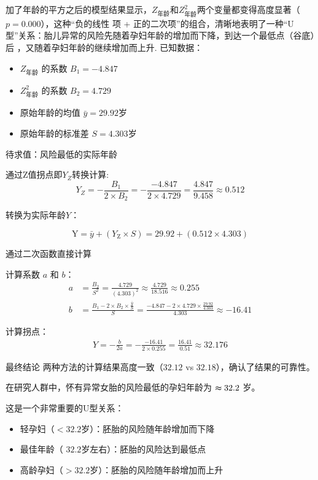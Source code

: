 \documentclass[withoutpreface,notoc]{cumcmthesis}
\begin{document}
	加了年龄的平方之后的模型结果显示，$Z_{\text{年龄}}$和$Z^{2}_{\text{年龄}}$两个变量都变得高度显著（$p=0.000$），这种“负的线性
	项 + 正的二次项”的组合，清晰地表明了一种“U型”关系：胎儿异常的风险先随着孕妇年龄的增加而下降，到达一个最低点（谷底）后
	，又随着孕妇年龄的继续增加而上升.
	已知数据：
	\begin{itemize}
		\item 	$Z_{\text{年龄}} $ 的系数  $B_{1} = -4.847$
		\item 	$Z^{2}_{\text{年龄}}$ 的系数 $B_{2} = 4.729$
		\item 	原始年龄的均值 $\bar{y} = 29.92 $岁
		\item 	原始年龄的标准差 $S = 4.303 $岁
	\end{itemize}

	待求值：风险最低的实际年龄

	通过Z值拐点即$Y_{Z}$转换计算:
	\begin{equation}
	Y_{Z} = -\frac{B_1}{2 \times B_2} = -\frac{-4.847}{2 \times 4.729} = \frac{4.847}{9.458} \approx 0.512
	\end{equation}

	转换为实际年龄$Y$：

	\begin{equation}
	\text{Y} = \bar{y} + (Y_{\text{Z}} \times S) = 29.92 + (0.512 \times 4.303)
	\end{equation}

	通过二次函数直接计算

	计算系数 $a$ 和 $b$：
	\begin{align}
	a &= \frac{B_2}{S^2} = \frac{4.729}{(4.303)^2} \approx \frac{4.729}{18.516} \approx 0.255 \\
	b &= \frac{B_1 - 2 \times B_2 \times \frac{\bar{y}}{S}}{S} = \frac{-4.847 - 2 \times 4.729 \times \frac{29.92}{4.303}}{4.303} \approx -16.41
	\end{align}

	计算拐点：
	\begin{align}
	Y = -\frac{b}{2a} = -\frac{-16.41}{2 \times 0.255} = \frac{16.41}{0.51} \approx 32.176
	\end{align}

	最终结论
	两种方法的计算结果高度一致（$32.12$ vs $32.18$），确认了结果的可靠性。

	在研究人群中，怀有异常女胎的风险最低的孕妇年龄为  $\thickapprox 32.2$ 岁。

	这是一个非常重要的U型关系：

	\begin{itemize}
	\item 轻孕妇（$<32.2$岁）：胚胎的风险随年龄增加而下降
	\item 最佳年龄（ $32.2$岁左右）：胚胎的风险达到最低点
	\item 高龄孕妇（$>32.2$岁）：胚胎的风险随年龄增加而上升
	\end{itemize}
\end{document}
